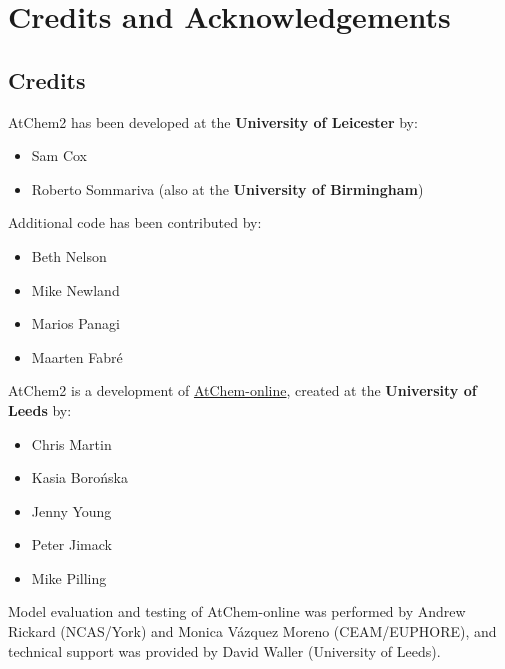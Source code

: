 %
%
%
%

\chapter{Credits and Acknowledgements} \label{ch:credits}

\section{Credits} \label{sec:credits}

AtChem2 has been developed at the \textbf{University of Leicester} by:

\begin{itemize}
\item Sam Cox
\item Roberto Sommariva (also at the \textbf{University of Birmingham})
\end{itemize}

\noindent
Additional code has been contributed by:

\begin{itemize}
\item Beth Nelson
\item Mike Newland
\item Marios Panagi
\item Maarten Fabr{\'e}
\end{itemize}

AtChem2 is a development of
\href{https://atchem.leeds.ac.uk/webapp/}{AtChem-online},
created at the \textbf{University of Leeds} by:

\begin{itemize}
\item Chris Martin
\item Kasia Boro{\'n}ska
\item Jenny Young
\item Peter Jimack
\item Mike Pilling
\end{itemize}

Model evaluation and testing of AtChem-online was performed by Andrew
Rickard (NCAS/York) and Monica V{\'a}zquez Moreno (CEAM/EUPHORE), and
technical support was provided by David Waller (University of Leeds).


